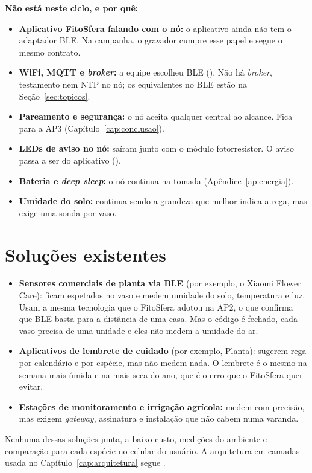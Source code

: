 \noindent\textbf{Não está neste ciclo, e por quê:}
\begin{itemize}
  \item \textbf{Aplicativo FitoSfera falando com o nó:} o aplicativo
    ainda não tem o adaptador BLE. Na campanha, o gravador cumpre esse
    papel e segue o mesmo contrato.
  \item \textbf{WiFi, MQTT e \emph{broker}:} a equipe escolheu BLE
    (). Não há \emph{broker}, testamento nem NTP no nó; os
    equivalentes no BLE estão na Seção~\ref{sec:topicos}.
  \item \textbf{Pareamento e segurança:} o nó aceita qualquer central ao
    alcance. Fica para a AP3 (Capítulo~\ref{cap:conclusao}).
  \item \textbf{LEDs de aviso no nó:} saíram junto com o módulo
    fotorresistor. O aviso passa a ser do aplicativo ().
  \item \textbf{Bateria e \emph{deep sleep}:} o nó continua na tomada
    (Apêndice~\ref{ap:energia}).
  \item \textbf{Umidade do solo:} continua sendo a grandeza que melhor
    indica a rega, mas exige uma sonda por vaso.
\end{itemize}

\section{Soluções existentes}

\begin{itemize}
  \item \textbf{Sensores comerciais de planta via BLE} (por exemplo, o
    Xiaomi Flower Care): ficam espetados no vaso e medem umidade do solo,
    temperatura e luz. Usam a mesma tecnologia que o FitoSfera adotou na
    AP2, o que confirma que BLE basta para a distância de uma casa. Mas o
    código é fechado, cada vaso precisa de uma unidade e eles não medem a
    umidade do ar.
  \item \textbf{Aplicativos de lembrete de cuidado} (por exemplo,
    Planta): sugerem rega por calendário e por espécie, mas não medem
    nada. O lembrete é o mesmo na semana mais úmida e na mais seca do
    ano, que é o erro que o FitoSfera quer evitar.
  \item \textbf{Estações de monitoramento e irrigação agrícola:} medem
    com precisão, mas exigem \emph{gateway}, assinatura e instalação que
    não cabem numa varanda.
\end{itemize}

Nenhuma dessas soluções junta, a baixo custo, medições do ambiente e
comparação para cada espécie no celular do usuário. A arquitetura em
camadas usada no Capítulo~\ref{cap:arquitetura} segue
.
